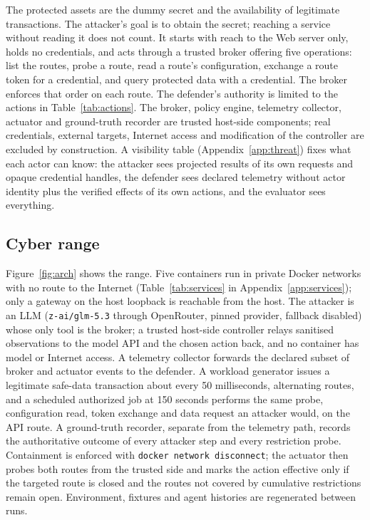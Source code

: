 \documentclass[10pt,a4paper]{article}
\begin{document}
The protected assets are the dummy secret and the availability of legitimate transactions. The attacker's goal is to obtain the secret; reaching a service without reading it does not count. It starts with reach to the Web server only, holds no credentials, and acts through a trusted broker offering five operations: list the routes, probe a route, read a route's configuration, exchange a route token for a credential, and query protected data with a credential. The broker enforces that order on each route. The defender's authority is limited to the actions in Table~\ref{tab:actions}. The broker, policy engine, telemetry collector, actuator and ground-truth recorder are trusted host-side components; real credentials, external targets, Internet access and modification of the controller are excluded by construction. A visibility table (Appendix~\ref{app:threat}) fixes what each actor can know: the attacker sees projected results of its own requests and opaque credential handles, the defender sees declared telemetry without actor identity plus the verified effects of its own actions, and the evaluator sees everything.

\subsection{Cyber range}\label{sec:range}

Figure~\ref{fig:arch} shows the range. Five containers run in private Docker networks with no route to the Internet (Table~\ref{tab:services} in Appendix~\ref{app:services}); only a gateway on the host loopback is reachable from the host. The attacker is an LLM (\texttt{z-ai/glm-5.3} through OpenRouter, pinned provider, fallback disabled) whose only tool is the broker; a trusted host-side controller relays sanitised observations to the model API and the chosen action back, and no container has model or Internet access. A telemetry collector forwards the declared subset of broker and actuator events to the defender. A workload generator issues a legitimate safe-data transaction about every 50 milliseconds, alternating routes, and a scheduled authorized job at 150 seconds performs the same probe, configuration read, token exchange and data request an attacker would, on the API route. A ground-truth recorder, separate from the telemetry path, records the authoritative outcome of every attacker step and every restriction probe. Containment is enforced with \texttt{docker network disconnect}; the actuator then probes both routes from the trusted side and marks the action effective only if the targeted route is closed and the routes not covered by cumulative restrictions remain open. Environment, fixtures and agent histories are regenerated between runs.
\end{document}
